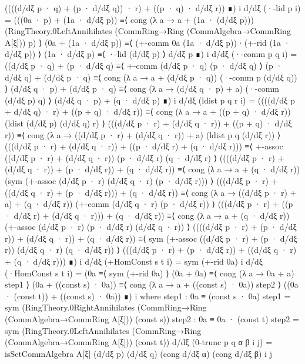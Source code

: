                               ((((d/dξ p · q) + (p · d/dξ q)) · r) + ((p · q) · d/dξ r)) ∎) i
    d/dξ (·-lid p i) = (((0a · p) + (1a · d/dξ p)) ≡⟨ cong (λ a → a + (1a · (d/dξ p))) (RingTheory.0LeftAnnihilates (CommRing→Ring (CommAlgebra→CommRing A[ξ])) p) ⟩ 
                        (0a + (1a · d/dξ p)) ≡⟨ (+-comm 0a (1a · d/dξ p)) ∙ (+-rid (1a · d/dξ p)) ⟩ 
                        (1a · d/dξ p) ≡⟨ ·-lid (d/dξ p) ⟩ 
                        d/dξ p ∎) i
    d/dξ (·-comm p q i) = ((d/dξ p · q) + (p · d/dξ q) ≡⟨ +-comm (d/dξ p · q) (p · d/dξ q) ⟩ 
                           (p · d/dξ q) + (d/dξ p · q) ≡⟨ cong (λ a → a + (d/dξ p · q)) (·-comm p (d/dξ q)) ⟩ 
                           (d/dξ q · p) + (d/dξ p · q) ≡⟨ cong (λ a → (d/dξ q · p) + a) (·-comm (d/dξ p) q) ⟩ 
                           (d/dξ q · p) + (q · d/dξ p) ∎) i
    d/dξ (ldist p q r i) = ((((d/dξ p + d/dξ q) · r) + ((p + q) · d/dξ r)) ≡⟨ cong (λ a → a + ((p + q) · d/dξ r)) (ldist (d/dξ p) (d/dξ q) r) ⟩ 
                            (((d/dξ p · r) + (d/dξ q · r)) + ((p + q) · d/dξ r)) ≡⟨ cong (λ a → ((d/dξ p · r) + (d/dξ q · r)) + a) (ldist p q (d/dξ r)) ⟩ 
                            (((d/dξ p · r) + (d/dξ q · r)) + ((p · d/dξ r) + (q · d/dξ r))) ≡⟨ +-assoc ((d/dξ p · r) + (d/dξ q · r)) (p · d/dξ r) (q · d/dξ r) ⟩ 
                            ((((d/dξ p · r) + (d/dξ q · r)) + (p · d/dξ r)) + (q · d/dξ r)) ≡⟨ cong (λ a → a + (q · d/dξ r)) (sym (+-assoc (d/dξ p · r) (d/dξ q · r) (p · d/dξ r))) ⟩ 
                            (((d/dξ p · r) + ((d/dξ q · r) + (p · d/dξ r))) + (q · d/dξ r)) ≡⟨ cong (λ a → ((d/dξ p · r) + a) + (q · d/dξ r)) (+-comm (d/dξ q · r) (p · d/dξ r)) ⟩ 
                            (((d/dξ p · r) + ((p · d/dξ r) + (d/dξ q · r))) + (q · d/dξ r)) ≡⟨ cong (λ a → a + (q · d/dξ r)) (+-assoc (d/dξ p · r) (p · d/dξ r) (d/dξ q · r)) ⟩ 
                            ((((d/dξ p · r) + (p · d/dξ r)) + (d/dξ q · r)) + (q · d/dξ r)) ≡⟨ sym (+-assoc ((d/dξ p · r) + (p · d/dξ r)) (d/dξ q · r) (q · d/dξ r)) ⟩ 
                            (((d/dξ p · r) + (p · d/dξ r)) + ((d/dξ q · r) + (q · d/dξ r))) ∎) i
    d/dξ (+HomConst s t i) = sym (+-rid 0a) i
    d/dξ (·HomConst s t i) = (0a ≡⟨ sym (+-rid 0a) ⟩ 
                              (0a + 0a) ≡⟨ cong (λ a → 0a + a) step1 ⟩ 
                              (0a + ((const s) · 0a)) ≡⟨ cong (λ a → a + ((const s) · 0a)) step2 ⟩ 
                              ((0a · (const t)) + ((const s) · 0a)) ∎) i
      where
        step1 : 0a ≡ (const s · 0a)
        step1 = sym (RingTheory.0RightAnnihilates (CommRing→Ring (CommAlgebra→CommRing A[ξ])) (const s))
        step2 : 0a ≡ 0a · (const t)
        step2 = sym (RingTheory.0LeftAnnihilates (CommRing→Ring (CommAlgebra→CommRing A[ξ])) (const t))
    d/dξ (0-trunc p q α β i j) = isSetCommAlgebra A[ξ] (d/dξ p) (d/dξ q) (cong d/dξ α) (cong d/dξ β) i j

